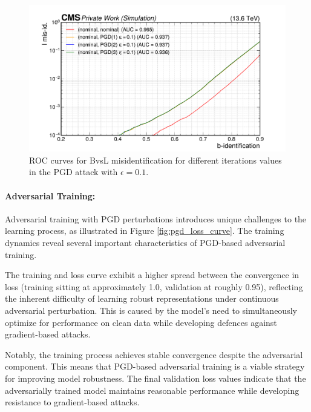 \begin{figure}[h]
\centering
    \includegraphics[width=12cm]{media/output/roc_bvsl_pgd_its_1_2_3.pdf}
    \caption{ROC curves for BvsL misidentification for different iterations values in the PGD attack with $\epsilon=0.1$.}
    \label{fig:pgd_iterations}
\end{figure}

\paragraph{Adversarial Training:} Adversarial training with PGD perturbations introduces unique challenges to the learning process, as illustrated in Figure \ref{fig:pgd_loss_curve}. The training dynamics reveal several important characteristics of PGD-based adversarial training.

The training and loss curve exhibit a higher spread between the convergence in loss (training sitting at approximately 1.0, validation at roughly 0.95), reflecting the inherent difficulty of learning robust representations under continuous adversarial perturbation. This is caused by the model's need to simultaneously optimize for performance on clean data while developing defences against gradient-based attacks.

Notably, the training process achieves stable convergence despite the adversarial component. This means that PGD-based adversarial training is a viable strategy for improving model robustness. The final validation loss values indicate that the adversarially trained model maintains reasonable performance while developing resistance to gradient-based attacks.

